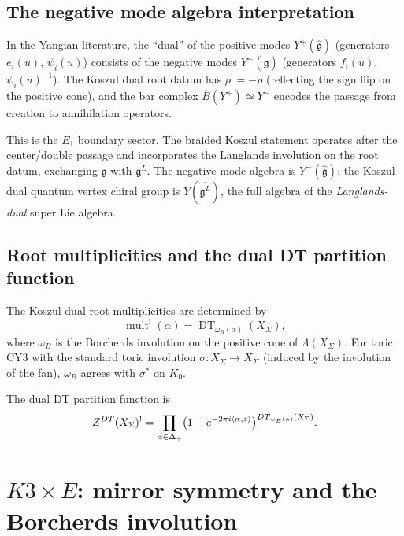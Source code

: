 \documentclass[11pt]{article}
\theoremstyle{definition}
\theoremstyle{remark}
\DeclareMathOperator{\mult}{mult}
\DeclareMathOperator{\DT}{DT}
\newcommand{\fkg}{\mathfrak{g}}
\newcommand{\barB}{\overline{B}}
\begin{document}
\subsection{The negative mode algebra interpretation}

In the Yangian literature, the ``dual'' of the positive modes
$Y^+(\widehat{\fkg})$ (generators $e_i(u)$, $\psi_i(u)$) consists of
the negative modes $Y^-(\widehat{\fkg})$ (generators $f_i(u)$,
$\psi_i(u)^{-1}$). The Koszul dual root datum has $\rho^! = -\rho$
(reflecting the sign flip on the positive cone), and the bar complex
$\barB(Y^+) \simeq Y^-$ encodes the passage from creation to
annihilation operators.

This is the $E_1$ boundary sector. The braided Koszul statement
operates after the center/double passage and incorporates the
Langlands involution on the root datum, exchanging $\fkg$ with
$\fkg^L$. The negative mode
algebra is $Y^-(\widehat{\fkg})$; the Koszul dual quantum vertex
chiral group is $Y(\widehat{\fkg^L})$, the full algebra of the
\emph{Langlands-dual} super Lie algebra.

\subsection{Root multiplicities and the dual DT partition function}

The Koszul dual root multiplicities are determined by
\begin{equation}\label{eq:dual-dt}
\mult^!(\alpha) = \DT_{\omega_B(\alpha)}(X_\Sigma),
\end{equation}
where $\omega_B$ is the Borcherds involution on the positive cone of
$\Lambda(X_\Sigma)$. For toric CY3 with the standard toric involution
$\sigma \colon X_\Sigma \to X_\Sigma$ (induced by the involution of the
fan), $\omega_B$ agrees with $\sigma^*$ on $K_0$.

The dual DT partition function is
\[
Z^{\DT}(X_\Sigma)^! =
\prod_{\alpha \in \Delta_+}
\bigl(1 - e^{-2\pi i \langle \alpha, z \rangle}\bigr)^{%
\DT_{\omega_B(\alpha)}(X_\Sigma)}.
\]


\section{$K3 \times E$: mirror symmetry and the Borcherds involution}
\label{sec:k3e}
\end{document}
